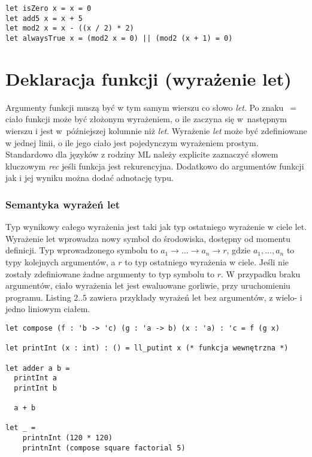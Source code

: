 \documentclass[declaration,shortabstract]{iithesis}
\begin{document}
\begin{lstlisting}[frame=single, caption=Przykłady wyrażeń arytmetycznych i 
logicznych.]
let isZero x = x = 0 
let add5 x = x + 5
let mod2 x = x - ((x / 2) * 2)
let alwaysTrue x = (mod2 x = 0) || (mod2 (x + 1) = 0)
\end{lstlisting}

\section{Deklaracja funkcji (wyrażenie let)}

Argumenty funkcji muszą być w tym samym wierszu co słowo \textit{let}. 
Po znaku~$=$ ciało funkcji może być złożonym wyrażeniem, o ile zaczyna się 
w~następnym wierszu i 
jest w~późniejszej kolumnie niż \textit{let}. Wyrażenie \textit{let} może być 
zdefiniowane w jednej linii, o ile jego ciało jest pojedynczym wyrażeniem prostym.
Standardowo dla języków z rodziny ML należy explicite zaznaczyć słowem 
kluczowym \textit{rec} jeśli funkcja jest rekurencyjna. Dodatkowo do argumentów
funkcji jak i jej wyniku można dodać adnotację typu.

\subsubsection{Semantyka wyrażeń let}

Typ wynikowy całego wyrażenia jest taki jak typ ostatniego wyrażenie w ciele 
let. Wyrażenie let wprowadza nowy symbol do środowiska, dostępny od momentu 
definicji. Typ wprowadzonego symbolu to $ a_1 \rightarrow ...\rightarrow a_n 
\rightarrow r $, gdzie $a_1, ..., a_n$ to typy kolejnych argumentów, a $r$ to 
typ ostatniego wyrażenia w ciele. Jeśli nie zostały zdefiniowane żadne argumenty 
to typ symbolu to $r$. W przypadku braku argumentów, ciało wyrażenia let 
jest ewaluowane gorliwie, przy uruchomieniu programu. Listing $2..5$ zawiera 
przykłady wyrażeń let bez argumentów, z wielo- i jedno liniowym ciałem.

\begin{lstlisting}[frame=single, caption=Deklaracja funkcji z anotacjami.]
let compose (f : 'b -> 'c) (g : 'a -> b) (x : 'a) : 'c = f (g x)

let printInt (x : int) : () = ll_putint x (* funkcja wewnętrzna *)

let adder a b = 
  printInt a 
  printInt b 

  a + b

let _ = 
    printnInt (120 * 120)
    printnInt (compose square factorial 5)
\end{lstlisting}
\end{document}
